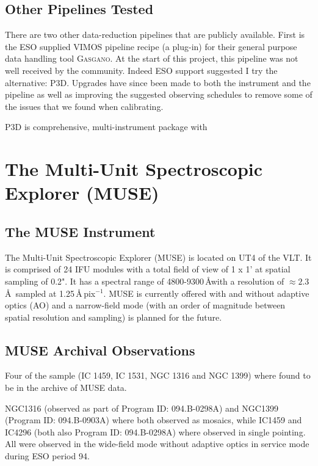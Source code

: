 	\subsection{Other Pipelines Tested}
		\label{subsec:Other}
		There are two other data-reduction pipelines that are publicly available. First is the ESO supplied VIMOS pipeline recipe (a plug-in) for their general purpose data handling tool \textsc{Gasgano}. At the start of this project, this pipeline was not well received by the community. Indeed ESO support suggested I try the alternative: \textsc{P3D}. Upgrades have since been made to both the instrument and the pipeline as well as improving the suggested observing schedules to remove some of the issues that we found when calibrating. 
		
		\textsc{P3D} is comprehensive, multi-instrument package with 






\section{The Multi-Unit Spectroscopic Explorer (MUSE)}
	\label{sec:MUSE}
	\subsection{The MUSE Instrument}
		The Multi-Unit Spectroscopic Explorer (MUSE) is located on UT4 of the VLT. It is comprised of 24 IFU modules with a total field of view of 1 x 1' at spatial sampling of 0.2". It has a spectral range of 4800-9300\,\AA with a resolution of $\approx 2.3$\,\AA\ sampled at 1.25\,\AA\,pix$^{-1}$. MUSE is currently offered with and without adaptive optics (AO) and a narrow-field mode (with an order of magnitude between spatial resolution and sampling) is planned for the future. 
		
	\subsection{MUSE Archival Observations}
		Four of the sample (IC 1459, IC 1531, NGC 1316 and NGC 1399) where found to be in the archive of MUSE data.

		NGC1316 (observed as part of Program ID: 094.B-0298A) and NGC1399 (Program ID: 094.B-0903A) where both observed as mosaics, while IC1459 and IC4296 (both also Program ID: 094.B-0298A) where observed in single pointing. All were observed in the wide-field mode without adaptive optics in service mode during ESO period 94. 

